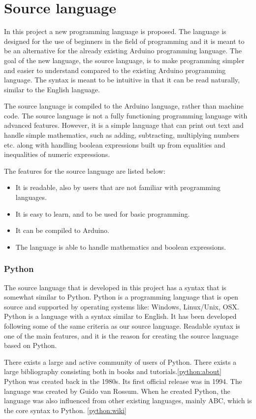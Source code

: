 \chapter{Source language}\label{analysis:source-language}
In this project a new programming language is proposed. The language is designed for the use of beginners in the field of programming and it is meant  to be an alternative for the already existing Arduino programming language.
The goal of the new language, the source language, is to make programming simpler and easier to understand compared to the existing Arduino programming language. The syntax is meant to be intuitive in that it can be read naturally, similar to the English language.

The source language is compiled to the Arduino language, rather than machine code. The source language is not a fully functioning programming language with advanced features. However, it is a simple language that can print out text and handle simple mathematics, such as adding, subtracting, multiplying numbers etc. along with handling boolean expressions built up from equalities and inequalities of numeric expressions.

The features for the source language are listed below:
\begin{itemize}
	\item It is readable, also by users that are not familiar with programming languages.
	\item It is easy to learn, and to be used for basic programming.
	\item It can be compiled to Arduino.
	\item The language is able to handle mathematics and boolean expressions.
\end{itemize}

\subsection{Python}
The source language that is developed in this project has a syntax that is somewhat similar to Python. Python is a programming language that is open source and supported by operating systems like: Windows, Linux/Unix, OSX. Python is a language with a syntax similar to English. It has been developed following some of the same criteria as our source language. Readable syntax is one of the main features, and it is the reason for creating the source language based on Python.
 
\cite{python:official:about}
There exists a large and active community of users of Python. There exists a large bibliography consisting both in books and tutorials.\ref{python:about} \\
Python was created back in the 1980s. Its first official release was in 1994. The language was created by Guido van Rossum. When he created Python, the language was also influenced from other existing languages, mainly ABC, which is the core syntax to Python. \ref{python:wiki}
